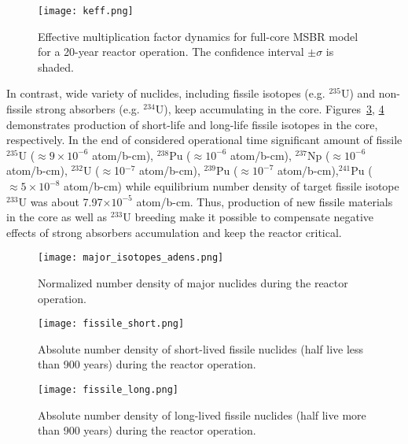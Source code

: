 \begin{figure}[htp!] %
  \centering
  \vspace{-0.3em}
  \texttt{[image: keff.png]}
  \caption{Effective multiplication factor dynamics for full-core \gls{MSBR} model for a 20-year reactor operation. The confidence interval $\pm\sigma$ is shaded.}
  \vspace{-0.6em}
  \label{fig:keff}
\end{figure}

In contrast, wide variety of nuclides, including fissile isotopes (e.g. $^{235}$U) and non-fissile strong absorbers (e.g. $^{234}$U), keep accumulating in the core. Figures~\ref{fig:fissile_short}, \ref{fig:fissile_long} demonstrates production of short-life and long-life fissile isotopes in the core, respectively. In the end of considered operational time significant amount of fissile $^{235}$U ($\approx 9\times10^{-6}$ atom/b-cm), $^{238}$Pu ($\approx 10^{-6}$ atom/b-cm), $^{237}$Np ($\approx10^{-6}$ atom/b-cm), $^{232}$U ($\approx$10$^{-7}$ atom/b-cm), $^{239}$Pu ($\approx10^{-7}$ atom/b-cm),$^{241}$Pu ($\approx 5\times10^{-8}$ atom/b-cm) while equilibrium number density of target fissile isotope $^{233}$U was about 7.97$\times10^{-5}$ atom/b-cm. Thus, production of new fissile materials in the core as well as $^{233}$U breeding make it possible to compensate negative effects of strong absorbers accumulation and keep the reactor critical.

\begin{figure}[htp!] %
  \centering
  \vspace{-0.3em}
  \texttt{[image: major\_isotopes\_adens.png]}
  \caption{Normalized number density of major nuclides during the reactor operation.}
  \vspace{-0.6em}
  \label{fig:adens_eq}
\end{figure}
\FloatBarrier

\begin{figure}[htp!] %
  \centering
  \vspace{-0.3em}
  \texttt{[image: fissile\_short.png]}
   \vspace{-1.6em}
  \caption{Absolute number density of short-lived fissile nuclides (half live less than 900 years) during the reactor operation.}
  \vspace{-1.6em}
  \label{fig:fissile_short}
\end{figure}
\begin{figure}[hbp!] %
  \centering
  \vspace{-0.3em}
  \texttt{[image: fissile\_long.png]}
   \vspace{-1.6em}
  \caption{Absolute number density of long-lived fissile nuclides (half live more than 900 years) during the reactor operation.}
  \vspace{-0.6em}
  \label{fig:fissile_long}
\end{figure}
\FloatBarrier

